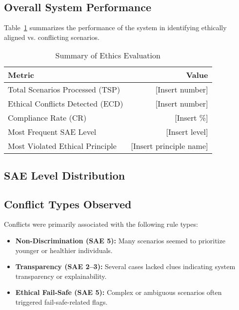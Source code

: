 \subsection{Overall System Performance}

Table~\ref{tab:ethics-summary} summarizes the performance of the system in identifying ethically aligned vs. conflicting scenarios.

\begin{table}
\centering
\caption{Summary of Ethics Evaluation}
\label{tab:ethics-summary}
\begin{tabular}{|l|r|}
\hline
\textbf{Metric} & \textbf{Value} \\
\hline
Total Scenarios Processed (TSP) & [Insert number] \\
Ethical Conflicts Detected (ECD) & [Insert number] \\
Compliance Rate (CR) & [Insert \%] \\
Most Frequent SAE Level & [Insert level] \\
Most Violated Ethical Principle & [Insert principle name] \\
\hline
\end{tabular}
\end{table}

\subsection{SAE Level Distribution}



\subsection{Conflict Types Observed}

Conflicts were primarily associated with the following rule types:

\begin{itemize}
    \item \textbf{Non-Discrimination (SAE 5):} Many scenarios seemed to prioritize younger or healthier individuals.
    \item \textbf{Transparency (SAE 2--3):} Several cases lacked clues indicating system transparency or explainability.
    \item \textbf{Ethical Fail-Safe (SAE 5):} Complex or ambiguous scenarios often triggered fail-safe-related flags.
\end{itemize}

